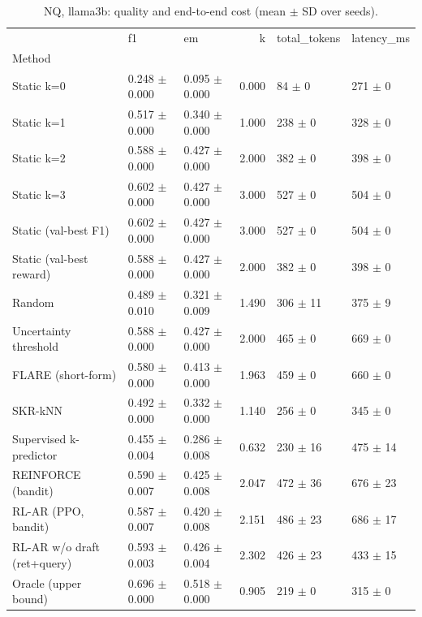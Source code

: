 \begin{table}
\caption{NQ, llama3b: quality and end-to-end cost (mean $\pm$ SD over seeds).}
\begin{tabular}{lllrll}
\toprule
 & f1 & em & k & total_tokens & latency_ms \\
Method &  &  &  &  &  \\
\midrule
Static k=0 & 0.248 $\pm$ 0.000 & 0.095 $\pm$ 0.000 & 0.000 & 84 $\pm$ 0 & 271 $\pm$ 0 \\
Static k=1 & 0.517 $\pm$ 0.000 & 0.340 $\pm$ 0.000 & 1.000 & 238 $\pm$ 0 & 328 $\pm$ 0 \\
Static k=2 & 0.588 $\pm$ 0.000 & 0.427 $\pm$ 0.000 & 2.000 & 382 $\pm$ 0 & 398 $\pm$ 0 \\
Static k=3 & 0.602 $\pm$ 0.000 & 0.427 $\pm$ 0.000 & 3.000 & 527 $\pm$ 0 & 504 $\pm$ 0 \\
Static (val-best F1) & 0.602 $\pm$ 0.000 & 0.427 $\pm$ 0.000 & 3.000 & 527 $\pm$ 0 & 504 $\pm$ 0 \\
Static (val-best reward) & 0.588 $\pm$ 0.000 & 0.427 $\pm$ 0.000 & 2.000 & 382 $\pm$ 0 & 398 $\pm$ 0 \\
Random & 0.489 $\pm$ 0.010 & 0.321 $\pm$ 0.009 & 1.490 & 306 $\pm$ 11 & 375 $\pm$ 9 \\
Uncertainty threshold & 0.588 $\pm$ 0.000 & 0.427 $\pm$ 0.000 & 2.000 & 465 $\pm$ 0 & 669 $\pm$ 0 \\
FLARE (short-form) & 0.580 $\pm$ 0.000 & 0.413 $\pm$ 0.000 & 1.963 & 459 $\pm$ 0 & 660 $\pm$ 0 \\
SKR-kNN & 0.492 $\pm$ 0.000 & 0.332 $\pm$ 0.000 & 1.140 & 256 $\pm$ 0 & 345 $\pm$ 0 \\
Supervised k-predictor & 0.455 $\pm$ 0.004 & 0.286 $\pm$ 0.008 & 0.632 & 230 $\pm$ 16 & 475 $\pm$ 14 \\
REINFORCE (bandit) & 0.590 $\pm$ 0.007 & 0.425 $\pm$ 0.008 & 2.047 & 472 $\pm$ 36 & 676 $\pm$ 23 \\
RL-AR (PPO, bandit) & 0.587 $\pm$ 0.007 & 0.420 $\pm$ 0.008 & 2.151 & 486 $\pm$ 23 & 686 $\pm$ 17 \\
RL-AR w/o draft (ret+query) & 0.593 $\pm$ 0.003 & 0.426 $\pm$ 0.004 & 2.302 & 426 $\pm$ 23 & 433 $\pm$ 15 \\
Oracle (upper bound) & 0.696 $\pm$ 0.000 & 0.518 $\pm$ 0.000 & 0.905 & 219 $\pm$ 0 & 315 $\pm$ 0 \\
\bottomrule
\end{tabular}
\end{table}
